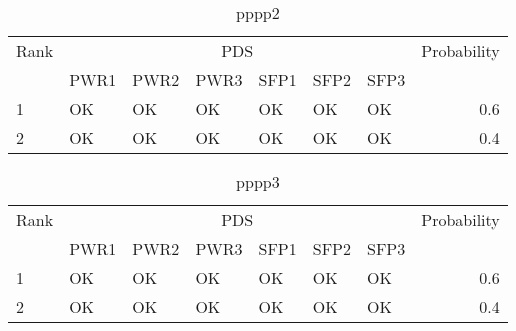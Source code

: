 \begin{table}
  \centering
  \begin{tabular}{lllllllr}
    \hline
    Rank & \multicolumn{6}{c}{PDS} & Probability           \\
    \cline{2-7}
         & PWR1 & PWR2 & PWR3 & SFP1 & SFP2 & SFP3 &       \\
    \hline
     1   & OK   & OK   & OK   & OK   & OK   & OK   & 0.6   \\
     2   & OK   & OK   & OK   & OK   & OK   & OK   & 0.4   \\
    \hline
  \end{tabular}
  \caption{pppp2}
  \label{tab:results2}
\end{table}

\begin{table}
  \centering
  \begin{tabular}{lllllllr}
    \hline
    Rank & \multicolumn{6}{c}{PDS} & Probability           \\
    \cline{2-7}
         & PWR1 & PWR2 & PWR3 & SFP1 & SFP2 & SFP3 &       \\
    \hline
     1   & OK   & OK   & OK   & OK   & OK   & OK   & 0.6   \\
     2   & OK   & OK   & OK   & OK   & OK   & OK   & 0.4   \\
    \hline
  \end{tabular}
  \caption{pppp3}
  \label{tab:results3}
\end{table}
